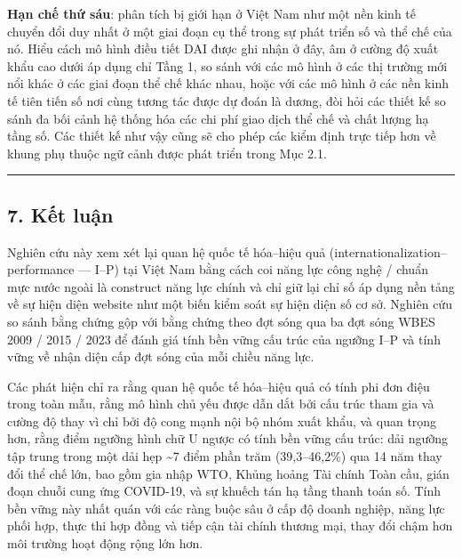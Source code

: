 \documentclass[12pt,a4paper]{article}
\begin{document}
\textbf{Hạn chế thứ sáu}: phân tích bị giới hạn ở Việt Nam như một nền
kinh tế chuyển đổi duy nhất ở một giai đoạn cụ thể trong sự phát triển
số và thể chế của nó. Hiểu cách mô hình điều tiết DAI được ghi nhận ở
đây, âm ở cường độ xuất khẩu cao dưới áp dụng chỉ Tầng 1, so sánh với
các mô hình ở các thị trường mới nổi khác ở các giai đoạn thể chế khác
nhau, hoặc với các mô hình ở các nền kinh tế tiên tiến số nơi cùng tương
tác được dự đoán là dương, đòi hỏi các thiết kế so sánh đa bối cảnh hệ
thống hóa các chi phí giao dịch thể chế và chất lượng hạ tầng số. Các
thiết kế như vậy cũng sẽ cho phép các kiểm định trực tiếp hơn về khung
phụ thuộc ngữ cảnh được phát triển trong Mục 2.1.

\begin{center}\rule{0.5\linewidth}{0.5pt}\end{center}

\hypertarget{7-kux1ebft-luux1eadn}{%
\subsection{7. Kết luận}\label{7-kux1ebft-luux1eadn}}

Nghiên cứu này xem xét lại quan hệ quốc tế hóa--hiệu quả
(internationalization--performance --- I--P) tại Việt Nam bằng cách coi
năng lực công nghệ / chuẩn mực nước ngoài là construct năng lực chính và
chỉ giữ lại chỉ số áp dụng nền tảng về sự hiện diện website như một biến
kiểm soát sự hiện diện số cơ sở. Nghiên cứu so sánh bằng chứng gộp với
bằng chứng theo đợt sóng qua ba đợt sóng WBES 2009 / 2015 / 2023 để đánh
giá tính bền vững cấu trúc của ngưỡng I--P và tính vững về nhận diện cấp
đợt sóng của mỗi chiều năng lực.

Các phát hiện chỉ ra rằng quan hệ quốc tế hóa--hiệu quả có tính phi đơn
điệu trong toàn mẫu, rằng mô hình chủ yếu được dẫn dắt bởi cấu trúc tham
gia và cường độ thay vì chỉ bởi độ cong mạnh nội bộ nhóm xuất khẩu, và
quan trọng hơn, rằng điểm ngưỡng hình chữ U ngược có tính bền vững cấu
trúc: dải ngưỡng tập trung trong một dải hẹp \textasciitilde7 điểm phần
trăm (39,3--46,2\%) qua 14 năm thay đổi thể chế lớn, bao gồm gia nhập
WTO, Khủng hoảng Tài chính Toàn cầu, gián đoạn chuỗi cung ứng COVID-19,
và sự khuếch tán hạ tầng thanh toán số. Tính bền vững này nhất quán với
các ràng buộc sâu ở cấp độ doanh nghiệp, năng lực phối hợp, thực thi hợp
đồng và tiếp cận tài chính thương mại, thay đổi chậm hơn môi trường hoạt
động rộng lớn hơn.
\end{document}
